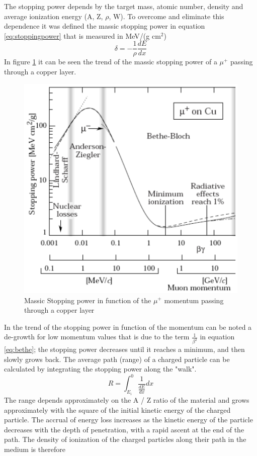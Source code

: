 \noindent The stopping power depends by the target mass, atomic number, density and average ionization energy (A, Z, $\rho$, W). To overcome and eliminate this dependence it was defined the massic stopping power in equation \ref{eq:stoppingpower} that is measured in MeV/(g cm${}^2$)
\begin{equation}\label{eq:stoppingpower}
	\delta = - \frac{1}{\rho} \frac{dE}{dx}
\end{equation}
\noindent In figure \ref{fig:massicstoppingpower} it can be seen the trend of the massic stopping power of a $\mu^+$ passing through a copper layer.
\begin{figure}[H]
	\centering
	\includegraphics[width=0.7\linewidth]{IMG/ch1/MassicStoppingPower}
	\caption{Massic Stopping power in function of the $\mu^+$ momentum passing through a copper layer}
	\label{fig:massicstoppingpower}
\end{figure}
\noindent In the trend of the stopping power in function of the momentum can be noted a de-growth for low momentum values that is due to the term $\frac{1}{\beta^2}$ in equation \ref{eq:bethe}; the stopping power decreases until it reaches a minimum, and then slowly grows back.
\newline
The average path (range) of a charged particle can be calculated by integrating the stopping power along the "walk".
\begin{equation}\label{eq:range}
	R=\int_{E_i}^{0} \frac{1}{\frac{dE}{dx}}dx
\end{equation}
\noindent The range depends approximately on the A / Z ratio of the material and grows approximately with the square of the initial kinetic energy of the charged particle. The accrual
of energy loss increases as the kinetic energy of the particle decreases with the depth of penetration, with a rapid ascent at the end of the path. The density of ionization of the charged particles along their path in the medium is therefore
